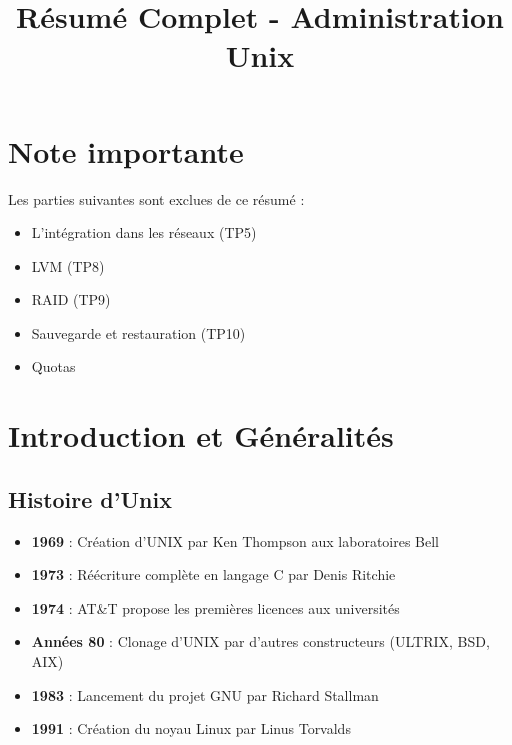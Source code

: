 \documentclass[12pt,a4paper]{article}
\title{\textbf{R\'esum\'e Complet - Administration Unix}}
\author{}
\date{}
\begin{document}
\maketitle
\thispagestyle{fancy}

\section*{Note importante}
Les parties suivantes sont exclues de ce r\'esum\'e :
\begin{itemize}
    \item L'int\'egration dans les r\'eseaux (TP5)
    \item LVM (TP8)
    \item RAID (TP9)
    \item Sauvegarde et restauration (TP10)
    \item Quotas
\end{itemize}

\newpage
\tableofcontents
\newpage


\section{Introduction et G\'en\'eralit\'es}


\subsection{Histoire d'Unix}
\begin{itemize}
    \item \textbf{1969} : Cr\'eation d'UNIX par Ken Thompson aux laboratoires Bell
    \item \textbf{1973} : R\'e\'ecriture compl\`ete en langage C par Denis Ritchie
    \item \textbf{1974} : AT\&T propose les premi\`eres licences aux universit\'es
    \item \textbf{Ann\'ees 80} : Clonage d'UNIX par d'autres constructeurs (ULTRIX, BSD, AIX)
    \item \textbf{1983} : Lancement du projet GNU par Richard Stallman
    \item \textbf{1991} : Cr\'eation du noyau Linux par Linus Torvalds
\end{itemize}
\end{document}
